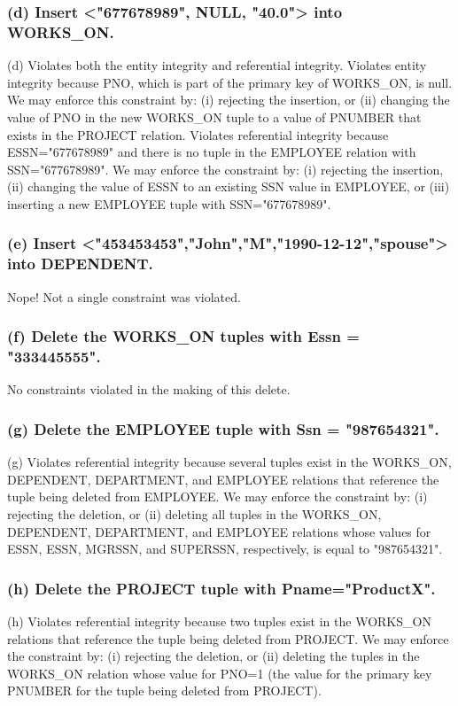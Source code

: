 \subsubsection*{(d) Insert <"677678989", NULL, "40.0"> into WORKS\_ON.}
(d) Violates both the entity integrity and referential integrity. Violates entity integrity because PNO, which is part of the primary key of WORKS\_ON, is null. We may enforce this constraint by: (i) rejecting the insertion, or (ii) changing the value of PNO in the new WORKS\_ON tuple to a value of PNUMBER that exists in the PROJECT relation. Violates referential integrity because ESSN="677678989" and there is no tuple in the EMPLOYEE relation with SSN="677678989". We may enforce the constraint by: (i) rejecting the insertion, (ii) changing the value of ESSN to an existing SSN value in EMPLOYEE, or (iii) inserting a new EMPLOYEE tuple with SSN="677678989".

\subsubsection*{(e) Insert <"453453453","John","M","1990-12-12","spouse"> into DEPENDENT.}
Nope! Not a single constraint was violated.

\subsubsection*{(f) Delete the WORKS\_ON tuples with Essn = "333445555".}
No constraints violated in the making of this delete.

\subsubsection*{(g) Delete the EMPLOYEE tuple with Ssn = "987654321".}
(g) Violates referential integrity because several tuples exist in the WORKS\_ON, DEPENDENT, DEPARTMENT, and EMPLOYEE relations that reference the tuple being deleted from EMPLOYEE. We may enforce the constraint by: (i) rejecting the deletion, or (ii) deleting all tuples in the WORKS\_ON, DEPENDENT, DEPARTMENT, and EMPLOYEE relations whose values for ESSN, ESSN, MGRSSN, and SUPERSSN, respectively, is equal to "987654321".

\subsubsection*{(h) Delete the PROJECT tuple with Pname="ProductX".}
(h) Violates referential integrity because two tuples exist in the WORKS\_ON relations that reference the tuple being deleted from PROJECT. We may enforce the constraint by: (i) rejecting the deletion, or (ii) deleting the tuples in the WORKS\_ON relation whose value for PNO=1 (the value for the primary key PNUMBER for the tuple being deleted from PROJECT).

